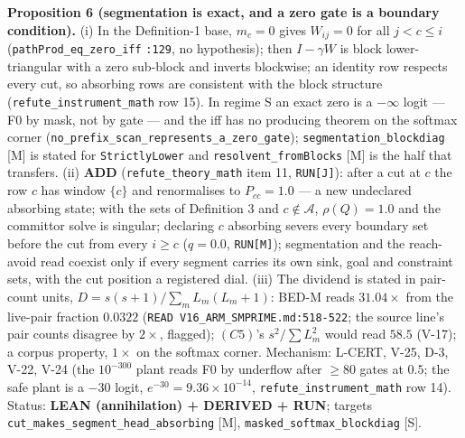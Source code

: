 \documentclass[11pt,a4paper]{article}
\theoremstyle{plain}
\theoremstyle{definition}
\theoremstyle{remark}
\begin{document}
\textbf{Proposition 6 (segmentation is exact, and a zero gate is a
boundary condition).} (i) In the Definition-1 base, \(m_c=0\) gives
\(W_{ij}=0\) for all \(j<c\le i\) (\texttt{pathProd\_eq\_zero\_iff}
\texttt{:129}, no hypothesis); then \(I-\gamma W\) is block
lower-triangular with a zero sub-block and inverts blockwise; an
identity row respects every cut, so absorbing rows are consistent with
the block structure (\texttt{refute\_instrument\_math} row 15). In
regime S an exact zero is a \(-\infty\) logit --- F0 by mask, not by
gate --- and the iff has no producing theorem on the softmax corner
(\texttt{no\_prefix\_scan\_represents\_a\_zero\_gate});
\texttt{segmentation\_blockdiag} {[}M{]} is stated for
\texttt{StrictlyLower} and \texttt{resolvent\_fromBlocks} {[}M{]} is the
half that transfers. (ii) \textbf{ADD} (\texttt{refute\_theory\_math}
item 11, \texttt{RUN{[}J{]}}): after a cut at \(c\) the row \(c\) has
window \(\{c\}\) and renormalises to \(P_{cc}=1.0\) --- a new undeclared
absorbing state; with the sets of Definition 3 and
\(c\notin\mathcal A\), \(\rho(Q)=1.0\) and the committor solve is
singular; declaring \(c\) absorbing severs every boundary set before the
cut from every \(i\ge c\) (\(q=0.0\), \texttt{RUN{[}M{]}}); segmentation
and the reach-avoid read coexist only if every segment carries its own
sink, goal and constraint sets, with the cut position a registered dial.
(iii) The dividend is stated in pair-count units,
\(D=s(s+1)/\sum_mL_m(L_m+1)\): BED-M reads \(31.04\times\) from the
live-pair fraction \(0.0322\)
(\texttt{READ\ V16\_ARM\_SMPRIME.md:518-522}; the source line's pair
counts disagree by \(2\times\), flagged); \((C5)\)'s \(s^2/\sum L_m^2\)
would read \(58.5\) (V-17); a corpus property, \(1\times\) on the
softmax corner. Mechanism: L-CERT, V-25, D-3, V-22, V-24 (the
\(10^{-300}\) plant reads F0 by underflow after \(\ge80\) gates at
\(0.5\); the safe plant is a \(-30\) logit,
\(e^{-30}=9.36\times10^{-14}\), \texttt{refute\_instrument\_math} row
14). Status: \textbf{LEAN (annihilation) + DERIVED + RUN}; targets
\texttt{cut\_makes\_segment\_head\_absorbing} {[}M{]},
\texttt{masked\_softmax\_blockdiag} {[}S{]}.
\end{document}
